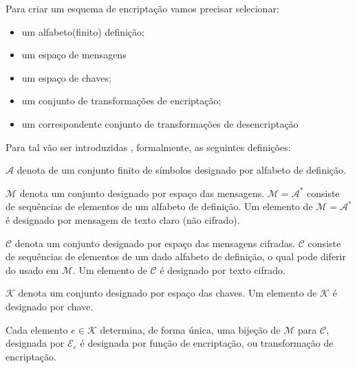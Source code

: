 Para criar um esquema de encriptação vamos precisar selecionar:

\begin{itemize}
    \item um alfabeto(finito) definição;
    \item um espaço de mensagens
    \item um espaço de chaves;
    \item um conjunto de transformações de encriptação;
    \item um correspondente conjunto de transformações de desencriptação
\end{itemize}

Para tal vão ser introduzidas , formalmente, as seguintes definições:

\begin{definicao}$\mathcal{A}$ denota de um conjunto finito de símbolos designado por alfabeto de definição.
\end{definicao}

\begin{definicao} $\mathcal{M}$ denota um conjunto designado por espaço das mensagens. $\mathcal{M}=\mathcal{A^*}$ consiste de sequências de elementos de um alfabeto de definição. Um elemento de $\mathcal{M}=\mathcal{A^*}$  é designado por mensagem de texto claro (não cifrado).
\end{definicao}

\begin{definicao}
$\mathcal{C}$ denota um conjunto designado por espaço das mensagens cifradas. $\mathcal{C}$ consiste de sequências de elementos de um dado alfabeto de definição, o qual pode diferir do usado em $\mathcal{M}$. Um elemento de $\mathcal{C}$ é designado por texto cifrado.
\end{definicao}

\begin{definicao} $\mathcal{K}$ denota um conjunto designado por espaço das chaves. Um elemento de $\mathcal{K}$ é designado por chave.
\end{definicao}

\begin{definicao} Cada elemento $e \in \mathcal{K}$ determina, de forma única, uma bijeção de $\mathcal{M}$ para $\mathcal{C}$, designada por $\mathcal{E}_e$ é designada por função de encriptação, ou transformação de encriptação.
\end{definicao}

